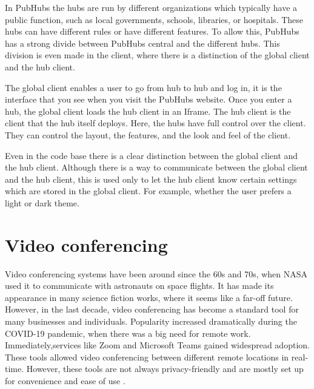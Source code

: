 \documentclass{report}
\begin{document}
In PubHubs the hubs are run by different organizations which typically have a public function, such as
local governments, schools, libraries, or hospitals.
These hubs can have different rules or have different features.
To allow this, PubHubs has a strong divide between PubHubs central and the different hubs.
This division is even made in the client, where there is a distinction of the global client and the hub client.

The global client enables a user to go from hub to hub and log in, it is
the interface that you see when you visit the PubHubs website.
Once you enter a hub, the global client loads the hub client in an Iframe. The hub client
is the client that the hub itself deploys. Here, the hubs have full control
over the client. They can control the layout, the features, and the look and feel of the client.

Even in the code base there is a clear distinction between the global client and the hub client.
Although there is a way to communicate between the global client and the hub client, this
is used only to let the hub client know certain settings which are stored in the global client.
For example, whether the user prefers a light or dark theme.


\section{Video conferencing}
Video conferencing systems have been around since the 60s and 70s, when NASA used it to communicate with astronauts
on space flights. It has made its appearance in many science fiction works, where it seems like a far-off future.
However, in the last decade, video conferencing has become a standard tool for many businesses and individuals.
Popularity increased dramatically during the COVID-19 pandemic, when there was a big need for remote work.
Immediately,services like Zoom \cite{noauthor_one_nodate} and Microsoft Teams  \cite{noauthor_microsoft_nodate} gained
widespread adoption. These tools allowed video conferencing between different remote locations in real-time.
However, these tools are not always privacy-friendly and are mostly set up for convenience and ease of use \cite{gauthier_dynamic_2021}.
\end{document}
